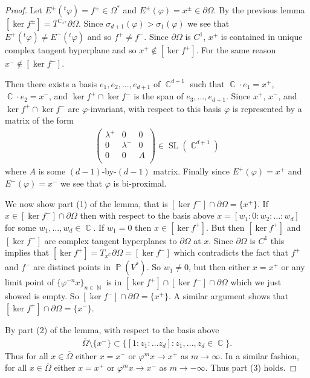 \documentclass[12pt]{amsart}
\theoremstyle{plain}
\theoremstyle{definition}
\theoremstyle{remark}
\begin{document}
\begin{proof}
Let $E^{\pm}(^t\varphi) = f^\pm \in \Omega^*$  and $E^\pm(\varphi)=x^\pm \in \partial \Omega$. By the previous lemma $[\ker f^{\pm} ]= T^\operatorname{\mathbb{C}}_{x^\mp} \partial \Omega$. Since $\sigma_{d+1}(\varphi ) > \sigma_1(\varphi )$ we see that $E^+(^t\varphi) \neq E^-(^t\varphi)$ and so $f^+ \neq f^-$. Since $\partial \Omega$ is $C^1$, $x^+$ is contained in unique complex tangent hyperplane and so $x^+ \notin [\ker f^+]$. For the same reason $x^- \notin [\ker f^-]$. 

Then there exists a basis $e_1, e_2, \dots, e_{d+1}$ of $\operatorname{\mathbb{C}}^{d+1}$ such that $\operatorname{\mathbb{C}}\cdot e_1 = x^+$, $\operatorname{\mathbb{C}} \cdot e_2 = x^-$, and $\ker f^+ \cap \ker f^-$ is the span of $e_3,\dots, e_{d+1}$. Since $x^+$, $x^-$, and $\ker f^+ \cap \ker f^-$ are $\varphi$-invariant, with respect to this basis $\varphi$ is represented by a matrix of the form
\begin{align*}
\begin{pmatrix}
\lambda^+ & 0 & 0 \\
0 & \lambda^- & 0 \\
0 & 0 & A \\
\end{pmatrix} \in \operatorname{SL}(\operatorname{\mathbb{C}}^{d+1})
\end{align*}
where $A$ is some $(d-1)$-by-$(d-1)$ matrix. Finally since $E^+(\varphi) = x^+$ and $E^-(\varphi)=x^-$ we see that $\varphi$ is bi-proximal. 

We now show part (1) of the lemma, that is $[\ker f^-] \cap \partial \Omega = \{ x^+\}$. If $x \in [\ker f^-] \cap \partial \Omega$ then with respect to the basis above $x = [ w_1 : 0 : w_2 : \dots : w_d]$ for some $w_1,\dots,w_d \in \operatorname{\mathbb{C}}$. If $w_1=0$ then $x \in [\ker f^+]$. But then $[\ker f^+]$ and $[\ker f^-]$ are complex tangent hyperplanes to $\partial \Omega$ at $x$. Since $\partial \Omega$ is $C^1$ this implies that $[\ker f^+]=T_x^\operatorname{\mathbb{C}}\partial\Omega =[\ker f^-]$ which contradicts the fact that $f^+$ and $f^-$ are distinct points in $\operatorname{\mathbb{P}}(V^*)$. So $w_1 \neq 0$, but then either $x=x^+$ or any limit point of $\{\varphi^{-n} x\}_{n \in \operatorname{\mathbb{N}}}$ is in $[\ker f^+] \cap [\ker f^-] \cap \partial \Omega$ which we just showed is empty. So $[\ker f^-] \cap \partial \Omega = \{ x^+\}$. A similar argument shows that $[\ker f^+] \cap \partial \Omega = \{ x^-\}$.

By part (2) of the lemma, with respect to the basis above 
\begin{align*}
\overline{\Omega} \setminus \{ x^-\} \subset \{ [1:z_1:\dots z_d] : z_1,\dots,z_d \in \operatorname{\mathbb{C}}\}.
\end{align*}
Thus for all $x \in \overline{\Omega}$ either $x=x^-$ or $\varphi^m x \rightarrow x^+$ as $m \rightarrow \infty$. In a similar fashion, for all $x \in \overline{\Omega}$ either $x=x^+$ or $\varphi^m x \rightarrow x^-$ as $m \rightarrow -\infty$. Thus part (3) holds. 
\end{proof}
\end{document}
